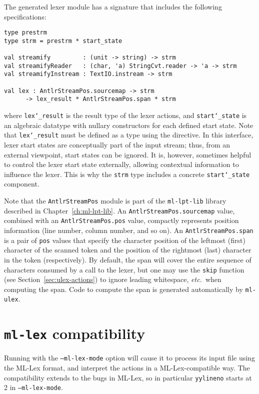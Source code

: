The generated lexer module has a signature that includes the following specifications:
\begin{lstlisting}
type prestrm
type strm = prestrm * start_state
    
val streamify         : (unit -> string) -> strm
val streamifyReader   : (char, 'a) StringCvt.reader -> 'a -> strm
val streamifyInstream : TextIO.instream -> strm
    
val lex : AntlrStreamPos.sourcemap -> strm
      -> lex_result * AntlrStreamPos.span * strm
\end{lstlisting}%
where \texttt{lex\char`\_result} is the result type of the lexer actions, and \texttt{start\char`\_state} is an algebraic datatype with nullary constructors for each defined start state.
Note that \texttt{lex\char`\_result} must be defined as a type using the  directive.
In this interface, lexer start states are conceptually part of the input stream; thus, from an external viewpoint,
start states can be ignored.
It is, however, sometimes helpful to control the lexer start state externally, allowing contextual
information to influence the lexer.
This is why the \texttt{strm} type includes a concrete \texttt{start\char`\_state} component.

Note that the \texttt{AntlrStreamPos} module is part of the \texttt{ml-lpt-lib} library described in Chapter~\ref{ch:ml-lpt-lib}. 
An \texttt{AntlrStreamPos.sourcemap} value, combined with an \texttt{AntlrStreamPos.pos} value, compactly represents position information (line number, column number, and so on).
An \texttt{AntlrStreamPos.span} is a pair of \texttt{pos} values that specify the character position of the
leftmost (first) character of the scanned token and the position of the
rightmost (last) character in the token (respectively).
By default, the span will cover the entire sequence of characters consumed by a call to the lexer, but one may
use the \texttt{skip} function (see Section~\ref{sec:ulex-actions}) to ignore leading whitespace,
\textit{etc.}\ when computing the span.
Code to compute the span is generated automatically by \texttt{ml-ulex}.

\section{\texttt{ml-lex} compatibility}\label{sec:lex-compat}

Running \ulex{} with the \texttt{--ml-lex-mode} option will cause it to process its input file using the ML-Lex format, and interpret the actions in a ML-Lex-compatible way.  The compatibility extends to the bugs in ML-Lex, so in particular \texttt{yylineno} starts at 2 in \texttt{--ml-lex-mode}.
